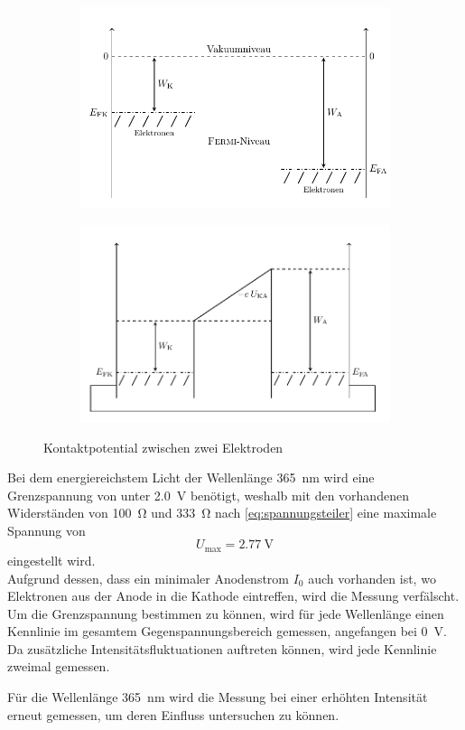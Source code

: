 \begin{figure}[htb]
	\centering
	\begin{subfigure}[c]{0.46\linewidth}
        \includegraphics[width=\linewidth]{../figs/fermi1.png}
    \end{subfigure}
	\begin{subfigure}[c]{0.46\linewidth}
        \includegraphics[width=\linewidth]{../figs/fermi2.png}
    \end{subfigure}
	\caption{Kontaktpotential zwischen zwei Elektroden}
\end{figure}

Bei dem energiereichstem Licht der Wellenlänge \SI{365}{\nano\meter} wird eine Grenzspannung von unter 
\SI{2.0}{\volt} benötigt, weshalb mit den vorhandenen Widerständen von \SI{100}{\ohm} und \SI{333}{\ohm}
nach \cref{eq:spannungsteiler} eine maximale Spannung von 
\[U_\mathrm{max} = \SI{2.77}{\volt}\]
eingestellt wird.\\
Aufgrund dessen, dass ein minimaler Anodenstrom $I_0$ auch vorhanden ist, wo Elektronen aus der 
Anode in die Kathode eintreffen, wird die Messung verfälscht. Um die Grenzspannung bestimmen zu können, 
wird für jede Wellenlänge einen Kennlinie im gesamtem Gegenspannungsbereich gemessen, angefangen 
bei \SI{0}{\volt}. Da zusätzliche Intensitätsfluktuationen auftreten können, wird jede Kennlinie 
zweimal gemessen.\\\par
Für die Wellenlänge \SI{365}{\nano\meter} wird die Messung bei einer erhöhten Intensität 
erneut gemessen, um deren Einfluss untersuchen zu können.

